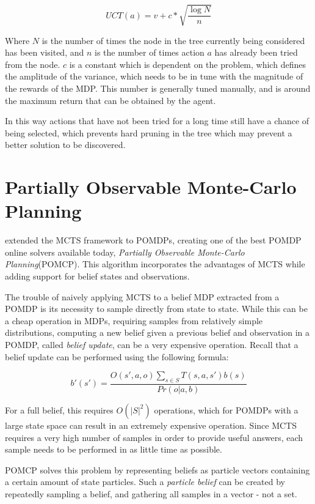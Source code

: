 \[ UCT(a) = v + c*\sqrt{\frac{\log{N}}{n}} \]

Where $N$ is the number of times the node in the tree currently being considered has been visited,
and $n$ is the number of times action $a$ has already been tried from the node. $c$ is a constant
which is dependent on the problem, which defines the amplitude of the variance, which needs to be in
tune with the magnitude of the rewards of the MDP. This number is generally tuned manually, and is
around the maximum return that can be obtained by the agent.

In this way actions that have not been tried for a long time still have a chance of being selected,
which prevents hard pruning in the tree which may prevent a better solution to be discovered.

\section[]{Partially Observable Monte-Carlo Planning%
}

\cite{cit:pomcp} extended the MCTS framework to POMDPs, creating one of the best POMDP online
solvers available today, \textit{Partially Observable Monte-Carlo Planning}(POMCP). This algorithm
incorporates the advantages of MCTS while adding support for belief states and observations.

The trouble of naively applying MCTS to a belief MDP extracted from a POMDP is its necessity to
sample directly from state to state. While this can be a cheap operation in MDPs, requiring
samples from relatively simple distributions, computing a new belief given a previous belief and
observation in a POMDP, called \textit{belief update}, can be a very expensive operation. Recall that a belief
update can be performed using the following formula:

\[ b'(s') = \frac{O(s', a, o)\sum_{s\in S}T(s,a,s')b(s)}{Pr(o|a,b)} \]

For a full belief, this requires $O(|S|^2)$ operations, which for POMDPs with a large state space
can result in an extremely expensive operation. Since MCTS requires a very high number of samples in
order to provide useful answers, each sample needs to be performed in as little time as possible.

POMCP solves this problem by representing beliefs as particle vectors containing a certain amount of
state particles. Such a \textit{particle belief} can be created by repeatedly sampling a belief, and
gathering all samples in a vector - not a set.

